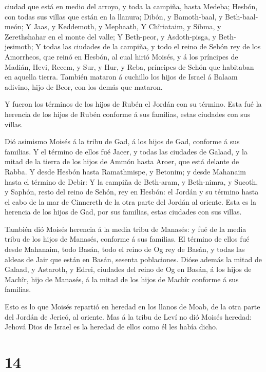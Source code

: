 ciudad que está en medio del arroyo, y toda la campiña, hasta Medeba;
 Hesbón, con todas sus villas que están en la llanura;
Dibón, y Bamoth-baal, y Beth-baal-meón;  Y Jaas, y
Keddemoth, y Mephaath,  Y Chîriataim, y Sibma, y
Zerethshahar en el monte del valle;  Y Beth-peor, y
Asdoth-pisga, y Beth-jesimoth;  Y todas las ciudades de la
campiña, y todo el reino de Sehón rey de los Amorrheos, que reinó en
Hesbón, al cual hirió Moisés, y á los príncipes de Madián, Hevi, Recem,
y Sur, y Hur, y Reba, príncipes de Sehón que habitaban en aquella
tierra.  También mataron á cuchillo los hijos de Israel á
Balaam adivino, hijo de Beor, con los demás que mataron.

 Y fueron los términos de los hijos de Rubén el Jordán con
su término. Esta fué la herencia de los hijos de Rubén conforme á sus
familias, estas ciudades con sus villas.

 Dió asimismo Moisés á la tribu de Gad, á los hijos de Gad,
conforme á sus familias.  Y el término de ellos fué Jacer,
y todas las ciudades de Galaad, y la mitad de la tierra de los hijos de
Ammón hasta Aroer, que está delante de Rabba.  Y desde
Hesbón hasta Ramathmispe, y Betonim; y desde Mahanaim hasta el término
de Debir:  Y la campiña de Beth-aram, y Beth-nimra, y
Sucoth, y Saphón, resto del reino de Sehón, rey en Hesbón: el Jordán y
su término hasta el cabo de la mar de Cinnereth de la otra parte del
Jordán al oriente.  Esta es la herencia de los hijos de
Gad, por sus familias, estas ciudades con sus villas.

 También dió Moisés herencia á la media tribu de Manasés: y
fué de la media tribu de los hijos de Manasés, conforme á sus familias.
 El término de ellos fué desde Mahanaim, todo Basán, todo
el reino de Og rey de Basán, y todas las aldeas de Jair que están en
Basán, sesenta poblaciones.  Dióse además la mitad de
Galaad, y Astaroth, y Edrei, ciudades del reino de Og en Basán, á los
hijos de Machîr, hijo de Manasés, á la mitad de los hijos de Machîr
conforme á sus familias.

 Esto es lo que Moisés repartió en heredad en los llanos de
Moab, de la otra parte del Jordán de Jericó, al oriente. 
Mas á la tribu de Leví no dió Moisés heredad: Jehová Dios de Israel es
la heredad de ellos como él les había dicho.

\hypertarget{section-13}{%
\section{14}\label{section-13}}

